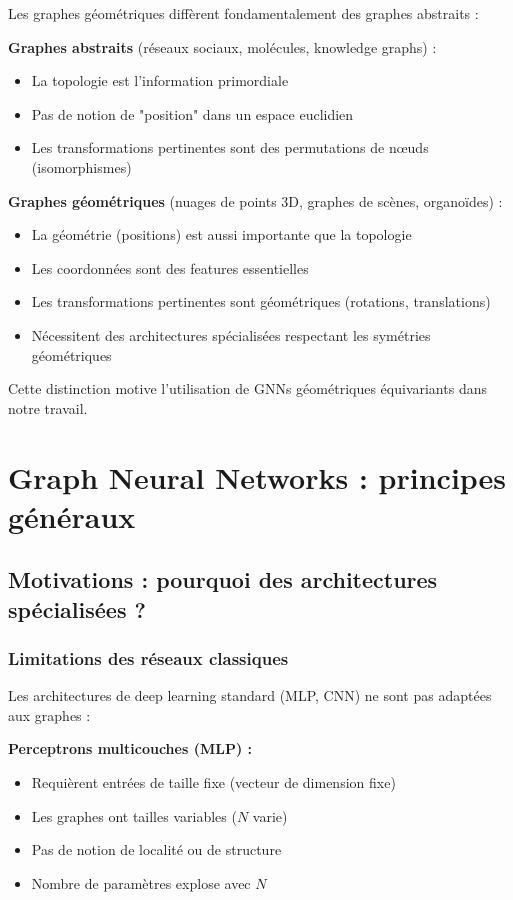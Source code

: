 Les graphes géométriques diffèrent fondamentalement des graphes abstraits :

\textbf{Graphes abstraits} (réseaux sociaux, molécules, knowledge graphs) :
\begin{itemize}
    \item La topologie est l'information primordiale
    \item Pas de notion de "position" dans un espace euclidien
    \item Les transformations pertinentes sont des permutations de nœuds (isomorphismes)
\end{itemize}

\textbf{Graphes géométriques} (nuages de points 3D, graphes de scènes, organoïdes) :
\begin{itemize}
    \item La géométrie (positions) est aussi importante que la topologie
    \item Les coordonnées sont des features essentielles
    \item Les transformations pertinentes sont géométriques (rotations, translations)
    \item Nécessitent des architectures spécialisées respectant les symétries géométriques
\end{itemize}

Cette distinction motive l'utilisation de GNNs géométriques équivariants dans notre travail.

\section{Graph Neural Networks : principes généraux}

\subsection{Motivations : pourquoi des architectures spécialisées ?}

\subsubsection{Limitations des réseaux classiques}

Les architectures de deep learning standard (MLP, CNN) ne sont pas adaptées aux graphes :

\textbf{Perceptrons multicouches (MLP) :}
\begin{itemize}
    \item Requièrent entrées de taille fixe (vecteur de dimension fixe)
    \item Les graphes ont tailles variables ($N$ varie)
    \item Pas de notion de localité ou de structure
    \item Nombre de paramètres explose avec $N$
\end{itemize}

